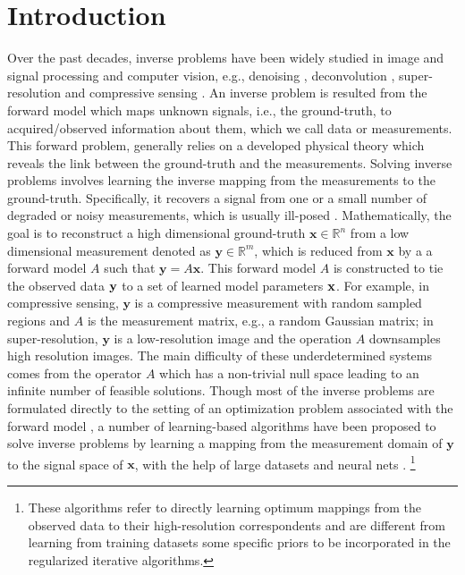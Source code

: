 \documentclass[10pt,twocolumn,letterpaper]{article}
\begin{document}
\section{Introduction}
Over the past decades, inverse problems have been widely studied in image and signal processing and computer vision,
e.g., denoising \cite{Elad2006}, deconvolution \cite{Afonso2010}, super-resolution \cite{Zhao2016} and compressive sensing \cite{Figueiredo2007gradient}. An inverse problem is resulted from the forward model which maps unknown signals, 
i.e., the ground-truth, to acquired/observed information about them, which we call data or measurements. 
This forward problem, generally relies on a developed physical theory which reveals the link between the ground-truth and
the measurements. Solving inverse problems involves learning the inverse mapping from the measurements to the ground-truth. 
Specifically, it recovers a signal from one or a small number of degraded or noisy measurements, which
is usually ill-posed \cite{Tikhonov1977}. 
Mathematically, the goal is to reconstruct a high dimensional ground-truth $\mathbf{x}\in \mathbb{R}^{n}$ 
from a low dimensional measurement denoted as $\mathbf{y}\in\mathbb{R}^{m}$, which is reduced from $\mathbf{x}$ by 
a a forward model $A$ such that $\mathbf{y} = A\mathbf{x}$. 
This forward model $A$ is constructed to tie the observed data ${\mathbf{y}}$ to a set of learned model parameters ${\mathbf{x}}$. 
For example, in compressive sensing, $\mathbf{y}$ is a compressive measurement with random sampled regions 
and $A$ is the measurement matrix, e.g., a random Gaussian matrix; in super-resolution, $\mathbf{y}$ is a 
low-resolution image and the operation $A$ downsamples high resolution images. 
The main difficulty of these underdetermined systems comes from the operator $A$ which 
has a non-trivial null space leading to an infinite number of feasible solutions. 
Though most of the inverse problems are formulated directly to the setting of an optimization 
problem associated with the forward model \cite{Tarantola2005inverse}, a number of learning-based algorithms
have been proposed to solve inverse problems by learning a mapping from the measurement domain of $\mathbf{y}$ 
to the signal space of $\mathbf{x}$, with the help of large datasets and neural nets \cite{Yao2004SR,Dong2016PAMI}. 
\footnote{These algorithms refer to directly learning optimum mappings from the observed data to their high-resolution correspondents and are different from learning from training datasets some specific priors to be incorporated in the regularized iterative algorithms\cite{Elad2006,Yang2010}.}
\end{document}
